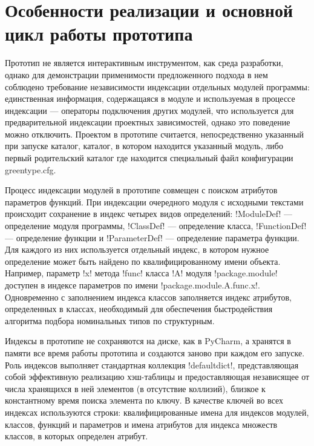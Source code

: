 
\section{Особенности реализации и основной цикл работы прототипа}
\label{sec:prototype-architecture}

Прототип не является интерактивным инструментом, как среда разработки, однако
для демонстрации применимости предложенного подхода в нем соблюдено требование
независимости индексации отдельных модулей программы: единственная информация,
содержащаяся в модуле и используемая в процессе индексации --- операторы
подключения других модулей, что используется для предварительной индексации
проектных зависимостей, однако это поведение можно отключить. Проектом в
прототипе считается, непосредственно указанный при запуске каталог, каталог, в
котором находится указанный модуль, либо первый родительский каталог где
находится специальный файл конфигурации greentype.cfg.

Процесс индексации модулей в прототипе совмещен с поиском атрибутов параметров
функций. При индексации очередного модуля с исходными текстами происходит
сохранение в индекс четырех видов определений: !ModuleDef! --- определение
модуля программы, !ClassDef! --- определение класса, !FunctionDef! ---
определение функции и !ParameterDef! --- определение параметра функции. Для
каждого из них используется отдельный индекс, в котором нужное определение может
быть найдено по квалифицированному имени объекта. Например, параметр !x! метода
!func! класса !A! модуля !package.module! доступен в индексе параметров по имени
!package.module.A.func.x!. Одновременно с заполнением индекса классов
заполняется индекс атрибутов, определенных в классах, необходимый для
обеспечения быстродействия алгоритма подбора номинальных типов по структурным.

Индексы в прототипе не сохраняются на диске, как в PyCharm, а хранятся в
памяти все время работы прототипа и создаются заново при каждом его запуске. Роль
индексов выполняет стандартная коллекция !defaultdict!, представляющая собой
эффективную реализацию хэш-таблицы и предоставляющая независящее от числа
хранящихся в ней элементов (в отсутствие коллизий), близкое к константному
время поиска элемента по ключу. В качестве ключей во всех индексах используются
строки: квалифицированные имена для индексов модулей, классов, функций и
параметров и имена атрибутов для индекса множеств классов, в которых определен
атрибут.

